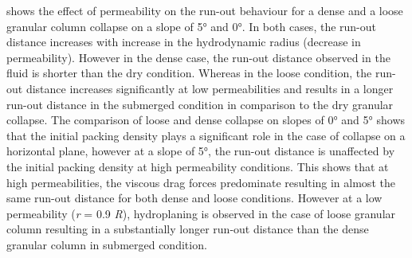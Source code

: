  shows the effect of permeability on the 
run-out behaviour for a dense and a loose granular column collapse on a slope 
of 5\si{\degree} and 0\si{\degree}. In both cases, the run-out distance 
increases with increase in the hydrodynamic radius (decrease in permeability). 
However in the dense case, the run-out distance observed in the fluid is 
shorter than the dry condition. Whereas in the loose condition, the run-out 
distance increases significantly at low permeabilities and results in a longer 
run-out distance in the submerged condition in comparison to the dry granular 
collapse. The comparison of loose and dense collapse on slopes of 
0\si{\degree} and 5\si{\degree} shows that the initial packing density plays a 
significant role in the case of collapse on a horizontal plane, however at a 
slope of 5\si{\degree}, the run-out distance is unaffected by the initial 
packing density at high permeability conditions. This shows that at high 
permeabilities, the viscous drag forces predominate resulting in almost the 
same run-out distance for both dense and loose conditions. However at a low 
permeability (\textit{r} = 0.9 \textit{R}), hydroplaning is observed in the 
case of loose 
granular column resulting in a substantially longer run-out distance than the 
dense granular column in submerged condition. 
%
